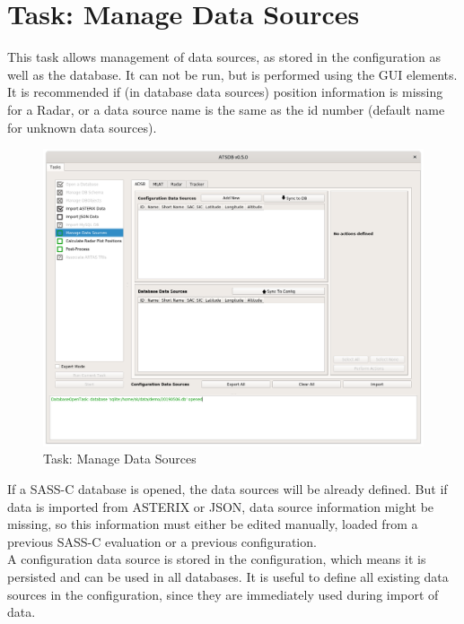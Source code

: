 \section{Task: Manage Data Sources}
\label{sec:task_manage_datasources}

This task allows management of data sources, as stored in the configuration as well as the database. It can not be run, but is performed using the GUI elements. \\

It is recommended if (in database data sources) position information is missing for a Radar, or a data source name is the same as the id number (default name for unknown data sources).

\begin{figure}[H]
  \hspace*{-2.5cm}
    \includegraphics[width=18cm]{../screenshots/manage_data_sources.png}
  \caption{Task: Manage Data Sources}
\end{figure}

If a SASS-C database is opened, the data sources will be already defined. But if data is imported from ASTERIX or JSON, data source information might be missing, so this information must either be edited manually, loaded from a previous SASS-C evaluation or a previous configuration. \\

A configuration data source is stored in the configuration, which means it is persisted and can be used in all databases. It is useful to define all existing data sources in the configuration, since they are immediately used during import of data. \\

